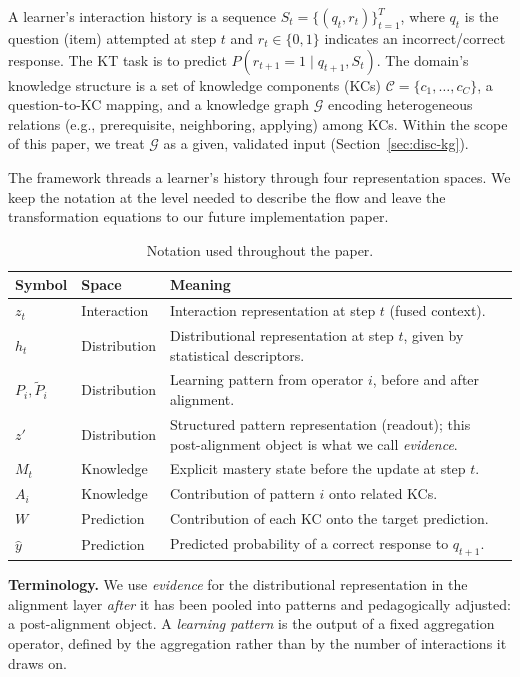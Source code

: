 \documentclass[conference]{IEEEtran}
\begin{document}
A learner's interaction history is a sequence $S_t=\{(q_t, r_t)\}_{t=1}^{T}$, where $q_t$ is the question (item) attempted at step $t$ and $r_t \in \{0,1\}$ indicates an incorrect/correct response. The KT task is to predict $P(r_{t+1}=1 \mid q_{t+1}, S_t)$. The domain's knowledge structure is a set of knowledge components (KCs) $\mathcal{C}=\{c_1,\dots,c_C\}$, a question-to-KC mapping, and a knowledge graph $\mathcal{G}$ encoding heterogeneous relations (e.g., prerequisite, neighboring, applying) among KCs. Within the scope of this paper, we treat $\mathcal{G}$ as a given, validated input (Section~\ref{sec:disc-kg}).

The framework threads a learner's history through four representation spaces. We keep the notation at the level needed to describe the flow and leave the transformation equations to our future implementation paper.

\begin{table}[!htbp]
\caption{Notation used throughout the paper.}
\label{tab:notation}
\centering
\renewcommand{\arraystretch}{1.25}
\begin{tabular}{@{}p{}p{}p{}@{}}
\toprule
\textbf{Symbol} & \textbf{Space} & \textbf{Meaning} \\
\midrule
$z_t$ & Interaction & Interaction representation at step $t$ (fused context). \\
$h_t$ & Distribution & Distributional representation at step $t$, given by statistical descriptors. \\
$P_i,\tilde{P}_i$ & Distribution & Learning pattern from operator $i$, before and after alignment. \\
$z'$ & Distribution & Structured pattern representation (readout); this post-alignment object is what we call \emph{evidence}. \\
$M_t$ & Knowledge & Explicit mastery state before the update at step $t$. \\
$A_i$ & Knowledge & Contribution of pattern $i$ onto related KCs. \\
$W$ & Prediction & Contribution of each KC onto the target prediction. \\
$\hat{y}$ & Prediction & Predicted probability of a correct response to $q_{t+1}$. \\
\bottomrule
\end{tabular}
\end{table}

\noindent\textbf{Terminology.} We use \emph{evidence} for the distributional representation in the alignment layer \emph{after} it has been pooled into patterns and pedagogically adjusted: a post-alignment object. A \emph{learning pattern} is the output of a fixed aggregation operator, defined by the aggregation rather than by the number of interactions it draws on.
\end{document}
